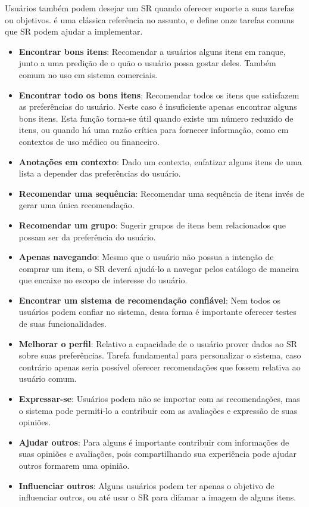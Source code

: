 Usuários também podem desejar um SR quando oferecer suporte a suas tarefas ou objetivos. \cite{Herlocker:2004:ECF:963770.963772} é uma clássica referência no assunto, e define onze tarefas comuns que SR podem ajudar a implementar. 

\begin{itemize}
	\item{\textbf{Encontrar bons itens}: Recomendar a usuários alguns itens em ranque, junto a uma predição de o quão o usuário possa gostar deles. Também comum no uso em sistema comerciais.}

	\item{\textbf{Encontrar todo os bons itens}: Recomendar todos os itens que satisfazem as preferências do usuário. Neste caso é insuficiente apenas encontrar alguns bons itens. Esta função torna-se útil quando existe um número reduzido de itens, ou quando há uma razão crítica para fornecer informação, como em contextos de uso médico ou financeiro.}

	\item{\textbf{Anotações em contexto}: Dado um contexto, enfatizar alguns itens de uma lista a depender das preferências do usuário.}

	\item{\textbf{Recomendar uma sequência}: Recomendar uma sequência de itens invés de gerar uma única recomendação.}

	\item{\textbf{Recomendar um grupo}: Sugerir grupos de itens bem relacionados que possam ser da preferência do usuário.}

	\item{\textbf{Apenas navegando}: Mesmo que o usuário não possua a intenção de comprar um item, o SR deverá ajudá-lo a navegar pelos catálogo de maneira que encaixe no escopo de interesse do usuário.}

	\item{\textbf{Encontrar um sistema de recomendação confiável}: Nem todos os usuários podem confiar no sistema, dessa forma é importante oferecer testes de suas funcionalidades.}

	\item{\textbf{Melhorar o perfil}: Relativo a capacidade de o usuário prover dados ao SR sobre suas preferências. Tarefa fundamental para personalizar o sistema, caso contrário apenas seria possível oferecer recomendações que fossem relativa ao usuário comum.}

	\item{\textbf{Expressar-se}: Usuários podem não se importar com as recomendações, mas o sistema pode permiti-lo a contribuir com as avaliações e expressão de suas opiniões.}

	\item{\textbf{Ajudar outros}: Para alguns é importante contribuir com informações de suas opiniões e avaliações, pois compartilhando sua experiência pode ajudar outros formarem uma opinião.}

	\item{\textbf{Influenciar outros}: Alguns usuários podem ter apenas o objetivo de influenciar outros, ou até usar o SR para difamar a imagem de alguns itens.}
\end{itemize}

